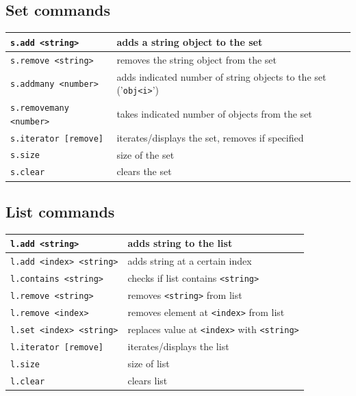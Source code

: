 \subsection*{Set commands}
\begin{tabular}{|p{}|p{}|}
    \hline
    \texttt{s.add <string>} & adds a string object to the set\\\hline
    \texttt{s.remove <string>} & removes the string object from the set\\\hline
    \texttt{s.addmany <number>} & adds indicated number of string objects to the set ('\texttt{obj<i>}')\\\hline
    \texttt{s.removemany <number>} & takes indicated number of objects from the set\\\hline
    \texttt{s.iterator [remove] } & iterates/displays the set, removes if specified\\\hline
    \texttt{s.size} & size of the set\\\hline
    \texttt{s.clear} & clears the set\\\hline
\end{tabular}
\subsection*{List commands}
\begin{tabular}{|p{}|p{}|}
    \hline
    \texttt{l.add <string>} & adds string to the list\\\hline
    \texttt{l.add <index> <string>} & adds string at a certain index\\\hline
    \texttt{l.contains <string>} & checks if list contains \texttt{<string>}\\\hline
    \texttt{l.remove <string>} & removes \texttt{<string>} from list\\\hline
    \texttt{l.remove <index>} & removes element at \texttt{<index>} from list\\\hline
    \texttt{l.set <index> <string>} & replaces value at \texttt{<index>} with \texttt{<string>}\\\hline
    \texttt{l.iterator [remove]} & iterates/displays the list\\\hline
    \texttt{l.size} & size of list\\\hline
    \texttt{l.clear} & clears list\\\hline
\end{tabular}
